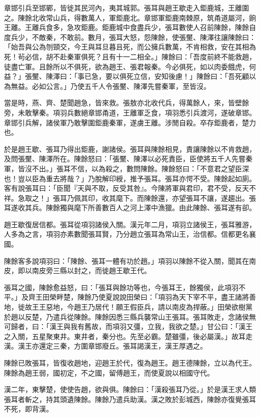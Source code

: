 \begin{pinyinscope}
章邯引兵至邯鄲，皆徙其民河內，夷其城郭。張耳與趙王歇走入鉅鹿城，王離圍之。陳餘北收常山兵，得數萬人，軍鉅鹿北。章邯軍鉅鹿南棘原，筑甬道屬河，餉王離。王離兵食多，急攻鉅鹿。鉅鹿城中食盡兵少，張耳數使人召前陳餘，陳餘自度兵少，不敵秦，不敢前。數月，張耳大怒，怨陳餘，使張黶、陳澤往讓陳餘曰：「始吾與公為刎頸交，今王與耳旦暮且死，而公擁兵數萬，不肯相救，安在其相為死！茍必信，胡不赴秦軍俱死？且有十一二相全。」陳餘曰：「吾度前終不能救趙，徒盡亡軍。且餘所以不俱死，欲為趙王、張君報秦。今必俱死，如以肉委餓虎，何益？」張黶、陳澤曰：「事已急，要以俱死立信，安知後慮！」陳餘曰：「吾死顧以為無益。必如公言。」乃使五千人令張黶、陳澤先嘗秦軍，至皆沒。

當是時，燕、齊、楚聞趙急，皆來救。張敖亦北收代兵，得萬餘人，來，皆壁餘旁，未敢擊秦。項羽兵數絕章邯甬道，王離軍乏食，項羽悉引兵渡河，遂破章邯。章邯引兵解，諸侯軍乃敢擊圍鉅鹿秦軍，遂虜王離。涉閒自殺。卒存鉅鹿者，楚力也。

於是趙王歇、張耳乃得出鉅鹿，謝諸侯。張耳與陳餘相見，責讓陳餘以不肯救趙，及問張黶、陳澤所在。陳餘怒曰：「張黶、陳澤以必死責臣，臣使將五千人先嘗秦軍，皆沒不出。」張耳不信，以為殺之，數問陳餘。陳餘怒曰：「不意君之望臣深也！豈以臣為重去將哉？」乃脫解印綬，推予張耳。張耳亦愕不受。陳餘起如廁。客有說張耳曰：「臣聞『天與不取，反受其咎』。今陳將軍與君印，君不受，反天不祥。急取之！」張耳乃佩其印，收其麾下。而陳餘還，亦望張耳不讓，遂趨出。張耳遂收其兵。陳餘獨與麾下所善數百人之河上澤中漁獵。由此陳餘、張耳遂有卻。

趙王歇復居信都。張耳從項羽諸侯入關。漢元年二月，項羽立諸侯王，張耳雅游，人多為之言，項羽亦素數聞張耳賢，乃分趙立張耳為常山王，治信都。信都更名襄國。

陳餘客多說項羽曰：「陳餘、張耳一體有功於趙。」項羽以陳餘不從入關，聞其在南皮，即以南皮旁三縣以封之，而徙趙王歇王代。

張耳之國，陳餘愈益怒，曰：「張耳與餘功等也，今張耳王，餘獨侯，此項羽不平。」及齊王田榮畔楚，陳餘乃使夏說說田榮曰：「項羽為天下宰不平，盡王諸將善地，徙故王王惡地，今趙王乃居代！願王假臣兵，請以南皮為捍蔽。」田榮欲樹黨於趙以反楚，乃遣兵從陳餘。陳餘因悉三縣兵襲常山王張耳。張耳敗走，念諸侯無可歸者，曰：「漢王與我有舊故，而項羽又彊，立我，我欲之楚。」甘公曰：「漢王之入關，五星聚東井。東井者，秦分也。先至必霸。楚雖彊，後必屬漢。」故耳走漢。漢王亦還定三秦，方圍章邯廢丘。張耳謁漢王，漢王厚遇之。

陳餘已敗張耳，皆復收趙地，迎趙王於代，復為趙王。趙王德陳餘，立以為代王。陳餘為趙王弱，國初定，不之國，留傅趙王，而使夏說以相國守代。

漢二年，東擊楚，使使告趙，欲與俱。陳餘曰：「漢殺張耳乃從。」於是漢王求人類張耳者斬之，持其頭遺陳餘。陳餘乃遣兵助漢。漢之敗於彭城西，陳餘亦復覺張耳不死，即背漢。


\end{pinyinscope}
